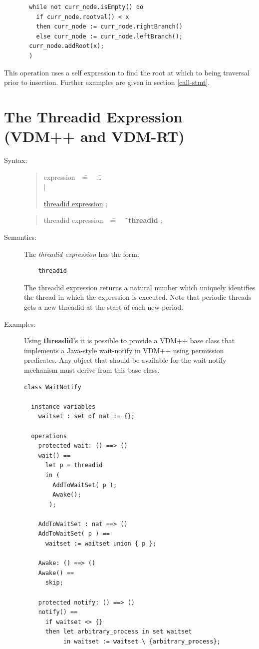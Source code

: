 \documentclass{overturerepchap}
\newcommand{\Rule}[2]{
  \begin{quote}\begin{tabbing}
    #1\index{#1}\ \ \= = \ \ \= #2  ; %

  \end{tabbing}\end{quote}
  }
\newcommand{\Ruleref}[1]{
  \hyperlink{rule:#1}{#1}}
\newcommand{\dsep}{\\ \> $|$ \>}
\newcommand{\Lop}[1]{`{\bf\ttfamily #1}\Quote}
\begin{document}
{\begin{description}
\begin{lstlisting}
       while not curr_node.isEmpty() do
         if curr_node.rootval() < x
         then curr_node := curr_node.rightBranch()
         else curr_node := curr_node.leftBranch();
       curr_node.addRoot(x);
       )
\end{lstlisting}
This operation uses a self expression to find the root at which to
being traversal prior to insertion. Further examples are given in
section \ref{call-stmt}.
\end{description}

\section{The Threadid Expression  (VDM++ and VDM-RT)}
\label{sec:threadid}

\begin{description}
\item[Syntax:]
  \Rule{expression}{
    \ldots \dsep
    \Ruleref{threadid expression}
    }
  \Rule{threadid expression}{
    \Lop{threadid}
  }

\item[Semantics:] The {\it threadid expression} has the form:

  \begin{lstlisting}
    threadid
  \end{lstlisting}
  The threadid expression returns a natural number which uniquely
  identifies the thread in which the expression is executed. Note that
  periodic threads gets a new threadid at the start of each new period.

\item[Examples:]
Using {\bf\ttfamily threadid}'s it is possible to provide a VDM++ base class that
implements a Java-style wait-notify in VDM++ using permission
predicates. Any object that should be available for the wait-notify
mechanism must derive from this base class.
\begin{lstlisting}
class WaitNotify

  instance variables
    waitset : set of nat := {};

  operations
    protected wait: () ==> ()
    wait() ==
      let p = threadid
      in (
        AddToWaitSet( p );
        Awake();
       );

    AddToWaitSet : nat ==> ()
    AddToWaitSet( p ) ==
      waitset := waitset union { p };

    Awake: () ==> ()
    Awake() ==
      skip;

    protected notify: () ==> ()
    notify() ==
      if waitset <> {}
      then let arbitrary_process in set waitset
           in waitset := waitset \ {arbitrary_process};


\end{lstlisting}
\end{description}}
\end{document}
